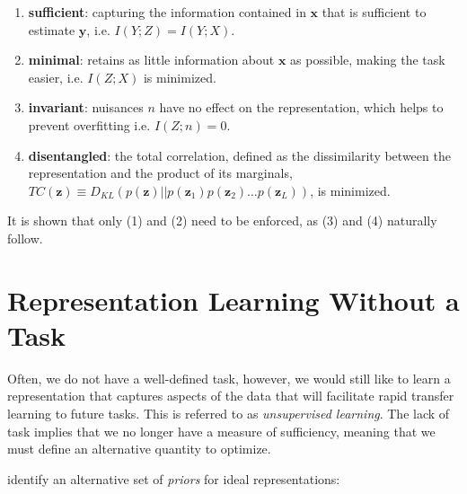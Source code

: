\begin{enumerate}
	\item \textbf{sufficient}: capturing the information contained in $\mathbf{x}$ that is sufficient to estimate $\mathbf{y}$, i.e. $I(Y; Z) = I(Y; X)$.
	\item \textbf{minimal}: retains as little information about $\mathbf{x}$ as possible, making the task easier, i.e. $I(Z; X)$ is minimized.
	\item \textbf{invariant}: nuisances $n$ have no effect on the representation, which helps to prevent overfitting i.e. $I(Z; n) = 0$.
	\item \textbf{disentangled}: the total correlation, defined as the dissimilarity between the representation and the product of its marginals, $TC(\mathbf{z}) \equiv D_{KL} (p(\mathbf{z}) || p(\mathbf{z}_1) p(\mathbf{z}_2) \dots p(\mathbf{z}_L))$, is minimized.
\end{enumerate}

\noindent It is shown that only (1) and (2) need to be enforced, as (3) and (4) naturally follow.


\section{Representation Learning Without a Task}
\label{sec: representation learning without a task}

Often, we do not have a well-defined task, however, we would still like to learn a representation that captures aspects of the data that will facilitate rapid transfer learning to future tasks. This is referred to as \textit{unsupervised learning}. The lack of task implies that we no longer have a measure of sufficiency, meaning that we must define an alternative quantity to optimize. 

\cite{bengio2013representation} identify an alternative set of \textit{priors} for ideal representations:

